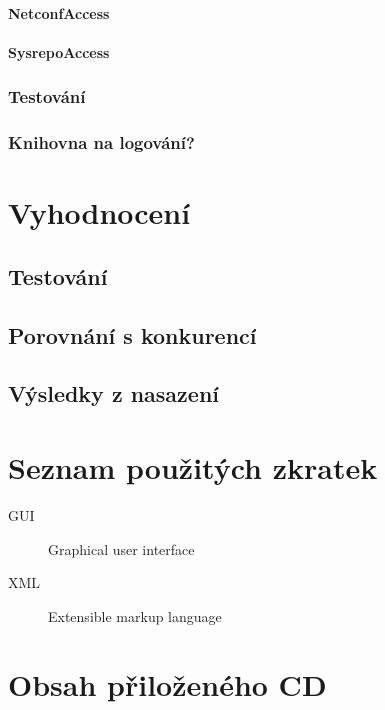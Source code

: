 \documentclass[thesis=B,czech]{FITthesis}[2019/03/06]
\begin{document}
\subsubsection{NetconfAccess}

\subsubsection{SysrepoAccess}

\subsection{Testování}

\subsection{Knihovna na logování?}


\chapter{Vyhodnocení}
\section{Testování}
\section{Porovnání s konkurencí}
\section{Výsledky z nasazení}

\begin{conclusion}
\end{conclusion}




\appendix

\chapter{Seznam použitých zkratek}
\begin{description}
	\item[GUI] Graphical user interface
	\item[XML] Extensible markup language
\end{description}

\chapter{Obsah přiloženého CD}

\end{document}
